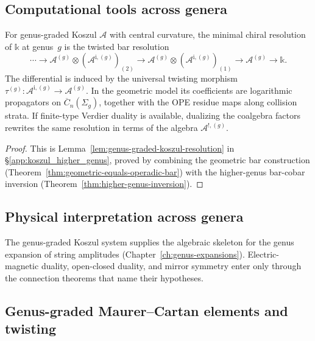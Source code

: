 \subsection{Computational tools across genera}

\begin{lemma}
\label{lem:genus-graded-koszul-resolution-appendix}
For genus-graded Koszul $\mathcal{A}$ with central curvature, the
minimal chiral resolution of $\mathbb{k}$ at genus~$g$ is the twisted
bar resolution
\[
\cdots \to
\mathcal{A}^{(g)}\otimes
(\mathcal{A}^{\mathrm i,(g)})_{(2)}
\to
\mathcal{A}^{(g)}\otimes
(\mathcal{A}^{\mathrm i,(g)})_{(1)}
\to
\mathcal{A}^{(g)}
\to
\mathbb{k}.
\]
The differential is induced by the universal twisting morphism
$\tau^{(g)}\colon\mathcal{A}^{\mathrm i,(g)}\to\mathcal{A}^{(g)}$.
In the geometric model its coefficients are logarithmic propagators
on $\overline{C}_n(\Sigma_g)$, together with the OPE residue maps
along collision strata. If finite-type Verdier duality is available,
dualizing the coalgebra factors rewrites the same resolution in terms
of the algebra $\mathcal{A}^{!,(g)}$.
\end{lemma}

\begin{proof}
This is Lemma~\ref{lem:genus-graded-koszul-resolution} in
\S\ref{app:koszul_higher_genus}, proved by combining the
geometric bar construction
(Theorem~\ref{thm:geometric-equals-operadic-bar}) with the higher-genus
bar-cobar inversion (Theorem~\ref{thm:higher-genus-inversion}).
\end{proof}

\subsection{Physical interpretation across genera}

The genus-graded Koszul system supplies the algebraic skeleton for the
genus expansion of string amplitudes
(Chapter~\ref{ch:genus-expansions}). Electric-magnetic duality,
open-closed duality, and mirror symmetry enter only through the
connection theorems that name their hypotheses.

\subsection{Genus-graded Maurer--Cartan elements and twisting}

